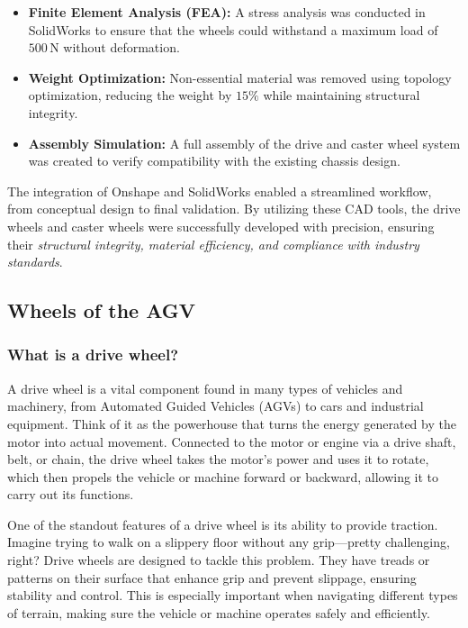 \documentclass[../../main]{subfiles}
\begin{document}
\begin{itemize}

\item \textbf{Finite Element Analysis (FEA):} A stress analysis was conducted in SolidWorks to ensure that the wheels could withstand a maximum load of $500 \, \mathrm{N}$ without deformation.

\item \textbf{Weight Optimization:} Non-essential material was removed using topology optimization, reducing the weight by $15\%$ while maintaining structural integrity.

\item \textbf{Assembly Simulation:} A full assembly of the drive and caster wheel system was created to verify compatibility with the existing chassis design.

\end{itemize}

The integration of Onshape and SolidWorks enabled a streamlined workflow, from conceptual design to final validation. By utilizing these CAD tools, the drive wheels and caster wheels were successfully developed with precision, ensuring their \emph{structural integrity, material efficiency, and compliance with industry standards}.

\subsection{Wheels of the AGV}
\subsubsection{What is a drive wheel?}
A drive wheel is a vital component found in many types of vehicles and machinery, from Automated Guided Vehicles (AGVs) to cars and industrial equipment. Think of it as the powerhouse that turns the energy generated by the motor into actual movement. Connected to the motor or engine via a drive shaft, belt, or chain, the drive wheel takes the motor's power and uses it to rotate, which then propels the vehicle or machine forward or backward, allowing it to carry out its functions.

One of the standout features of a drive wheel is its ability to provide traction. Imagine trying to walk on a slippery floor without any grip—pretty challenging, right? Drive wheels are designed to tackle this problem. They have treads or patterns on their surface that enhance grip and prevent slippage, ensuring stability and control. This is especially important when navigating different types of terrain, making sure the vehicle or machine operates safely and efficiently.
\end{document}
